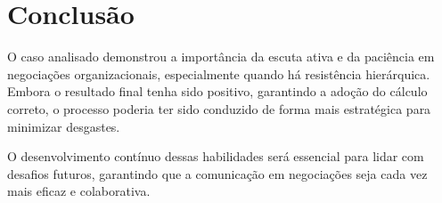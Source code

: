 \documentclass[11pt]{article}
\begin{document}
\section*{Conclusão}
\label{sec:orgeacf1e4}
O caso analisado demonstrou a importância da escuta ativa e da paciência em negociações organizacionais, especialmente quando há resistência hierárquica. Embora o resultado final tenha sido positivo, garantindo a adoção do cálculo correto, o processo poderia ter sido conduzido de forma mais estratégica para minimizar desgastes.

O desenvolvimento contínuo dessas habilidades será essencial para lidar com desafios futuros, garantindo que a comunicação em negociações seja cada vez mais eficaz e colaborativa.
\end{document}
